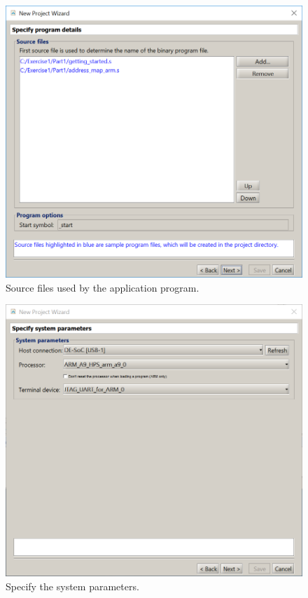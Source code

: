 \documentclass[epsfig,10pt,fullpage]{article}
\begin{document}
\begin{enumerate}
\begin{figure}[H]
	\begin{center}
	\includegraphics[scale=0.65]{figures/figureMP5.png}
	\end{center}
	\caption{Source files used by the application program.}
\label{fig:MP5}
\end{figure}

\begin{figure}[H]
	\begin{center}
	\includegraphics[scale=0.75]{figures/figureMP6.png}
	\end{center}
	\caption{Specify the system parameters.}
\label{fig:MP6}
\end{figure}


\end{enumerate}
\end{document}
